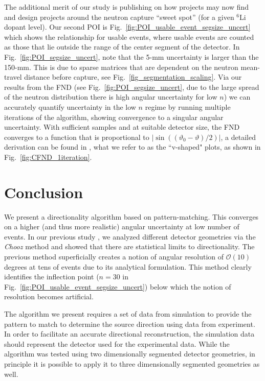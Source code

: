 \documentclass[tightenlines,twocolumn,prl,notitlepage,nofootinbib,preprintnumbers,longbibliography]{revtex4-1}
\begin{document}
The additional merit of our study is publishing on how projects may now find and design projects around the neutron capture ``sweet spot'' (for a given $^6$Li dopant level). Our second POI is Fig.~\ref{fig:POI_usable_event_segsize_uncert} which shows the relationship for usable events, where usable events are counted as those that lie outside the range of the center segment of the detector. In Fig.~\ref{fig:POI_segsize_uncert}, note that the 5-mm uncertainty is larger than the 150-mm. This is due to sparse matrices that are dependent on the neutron mean-travel distance before capture, see Fig.~\ref{fig_segmentation_scaling}.  Via our results from the FND (see Fig.~\ref{fig:POI_segsize_uncert}, due to the large spread of the neutron distribution there is high angular uncertainty for low $n$) we can accurately quantify uncertainty in the low $n$ regime by running multiple iterations of the algorithm, showing convergence to a singular angular uncertainty. With sufficient samples and at suitable detector size, the FND converges to a function that is proportional to $|\sin((\vartheta_0-\vartheta)/2)|$, a detailed derivation can be found in \cite{10.1063/5.0315079}, what we refer to as the ``v-shaped" plots, as shown in Fig.~\ref{fig:CFND_1iteration}. 


\section{Conclusion}

We present a directionality algorithm based on pattern-matching. This converges on a higher (and thus more realistic) angular uncertainty at low number of events. 
In our previous study \cite{Duvall:2024cae}, we analyzed different detector geometries via the \textit{Chooz} method and showed that there are statistical limits to directionality. 
The previous method superficially creates a notion of angular resolution of $\mathcal{O}(10)$ degrees at tens of events due to its analytical formulation.
This method clearly identifies the inflection point ($n=30$ in Fig.~\ref{fig:POI_usable_event_segsize_uncert}) below which the notion of resolution becomes artificial. 
 
The algorithm we present requires a set of data from simulation to provide the pattern to match to determine the source direction using data from experiment. In order to facilitate an accurate directional reconstruction, the simulation data should represent  the detector used for the experimental data. While the algorithm was tested using two dimensionally segmented detector geometries, in principle it is possible to apply it to three dimensionally segmented geometries as well.
\end{document}
